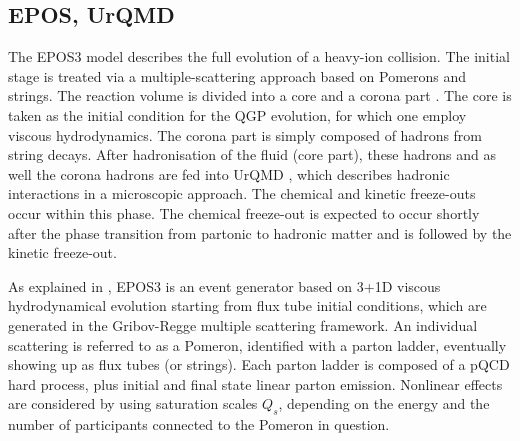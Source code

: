 \newpage

\subsection{EPOS, UrQMD}
The EPOS3 model \cite{cite:EPOSa, cite:EPOSb, cite:EPOSc} describes the full evolution of a heavy-ion collision. The initial stage is treated via a multiple-scattering approach based on Pomerons and strings. The reaction volume is divided into a core and a corona part \cite{cite:EPOSd}. The core is taken as the initial condition for the QGP evolution, for which one employ viscous hydrodynamics. The corona part is simply composed of hadrons from string decays. After hadronisation of the fluid (core part), these hadrons and as well the corona hadrons are fed into UrQMD \cite{cite:URQMDa, cite:URQMDb}, which describes hadronic interactions in a microscopic approach. The chemical and kinetic freeze-outs occur within this phase. The chemical freeze-out is expected to occur shortly after the phase transition from partonic to hadronic matter and is followed by the kinetic freeze-out.


As explained in \cite{cite:EPOSa, cite:EPOSb, cite:EPOSc, cite:EPOSd}, EPOS3 is an event generator based on 3+1D viscous hydrodynamical evolution starting from flux tube initial conditions, which are generated in the Gribov-Regge multiple scattering framework. An individual scattering is referred to as a Pomeron, identified with a parton ladder, eventually showing up as flux tubes (or strings). Each parton ladder is composed of a pQCD hard process, plus initial and final state linear parton emission. Nonlinear effects are considered by using saturation scales $Q_{s}$, depending on the energy and the number of participants connected to the Pomeron in question.



